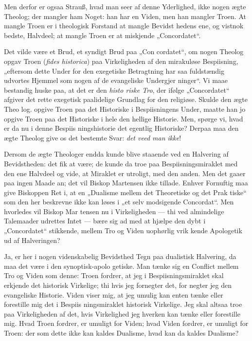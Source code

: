 \documentclass[12pt]{book}
\newcommand{\opage}[1]{\marginnote{\footnotesize\textit{[#1]}}}
\begin{document}
Men derfor er ogsaa Strauß, hvad man seer af denne
Yderlighed, ikke nogen ægte Theolog; der mangler ham
Noget: han har en Viden, men han mangler Troen. At
mangle Troen er i theologisk Forstand at mangle Bevidst\-%
hedens ene, og vistnok bedste, Halvdeel; at mangle Troen
er at miskjende „Concordatet“.

\opage{72}\setcounter{footnote}{0}%
Det vilde være et Brud, et syndigt Brud paa „Con\-%
cordatet“, om nogen Theolog opgav Troen (\textit{fides historica})
paa Virkeligheden af den mirakuløse Bespiisning, „eftersom
dette Under for den exegetiske Betragtning har saa fuldstændig
udvortes Hjemmel som nogen af de evangeliske Undergjer\-%
ninger“. Vi maae bestandig huske paa, at det er den \emph{histo\-%
riske Tro}, der ifølge „Concordatet“ afgiver det rette exegetisk
paalidelige Grundlag for den religiøse. Skulde den ægte Theo\-%
log. opgive Troen paa det Historiske i Bespiisningens Under,
maatte han jo opgive Troen paa det Historiske i hele den hellige
Historie. Men, spørge vi, hvad er da nu i denne Bespiis\-%
ningshistorie det egentlig Historiske? Derpaa maa den ægte
Theolog give os det bestemte Svar: \emph{det veed man ikke}!

Dersom de ægte Theologer endda kunde blive staaende
ved en Halvering af Bevidstheden: det fik at være; de kunde
da troe paa Bespiisningsmiraklet med den ene Halvdeel og
vide, at Miraklet er utroligt, med den anden. Men det
gaaer paa ingen Maade an; det vil Biskop Martensen
ikke tillade. Enhver Fornuftig maa give Biskoppen Ret
i, at en „Dualisme mellem det Theoretiske og det Prak\-%
tiske“ som den her beskrevne ikke kan løses i „et selv\-%
modsigende Concordat“. Men hvorledes vil Biskop Mar\-%
tensen nu i Virkeligheden --- thi ved almindelige Talemaader
udrettes Intet --- bære sig ad med at hjælpe den dybt i
„Concordatet“ stikkende, mellem Tro og Viden uophørlig vrik\-%
kende Apologetik ud af Halveringen?

Ja, er her i nogen videnskabelig Bevidsthed Tegn paa
dualistisk Halvering, da maa det være i den synoptisk-apolo\-%
getiske. Man tænke sig en Conflict mellem Tro og Viden
som denne: Troen fordrer, at jeg i Bespiisningsmiraklet skal
erkjende det historisk Virkelige; thi hvis jeg fornegter det, for\-%
negter jeg den evangeliske Historie. Viden viser mig, at jeg
umulig kan enten tænke eller forestille mig det i Bespiis\-%
ningsmiraklet historisk Virkelige. Jeg skal altsaa troe paa
\opage{73}\setcounter{footnote}{0}%
Virkeligheden af det, hvis Virkelighed jeg hverken kan tænke
eller forestille mig. Hvad Troen fordrer, er umuligt for
Viden; hvad Viden fordrer, er umuligt for Troen: der\-%
som dette ikke kan kaldes Dualisme, hvad kan da kaldes
Dualisme?
\end{document}
